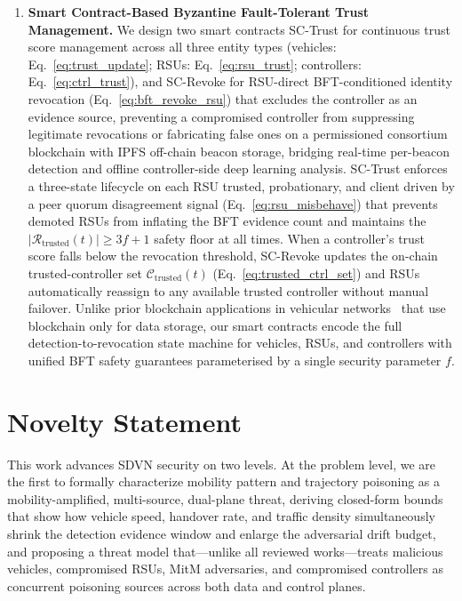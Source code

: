 \documentclass[12pt, a4paper]{report}
\begin{document}
\begin{enumerate}
\item \textbf{Smart Contract-Based Byzantine Fault-Tolerant Trust Management.}
We design two smart contracts
SC-Trust for continuous trust score management across all three
entity types (vehicles: Eq.~\eqref{eq:trust_update};
RSUs: Eq.~\eqref{eq:rsu_trust};
controllers: Eq.~\eqref{eq:ctrl_trust}),
and SC-Revoke for RSU-direct BFT-conditioned identity revocation
(Eq.~\eqref{eq:bft_revoke_rsu}) that excludes the controller
as an evidence source, preventing a compromised controller from
suppressing legitimate revocations or fabricating false ones
on a permissioned consortium blockchain with IPFS off-chain beacon
storage, bridging real-time per-beacon detection and offline
controller-side deep learning analysis.
SC-Trust enforces a three-state lifecycle on each RSU trusted,
probationary, and client driven by a peer quorum disagreement
signal (Eq.~\eqref{eq:rsu_misbehave}) that prevents demoted RSUs
from inflating the BFT evidence count and maintains the
$|\mathcal{R}_{\mathrm{trusted}}(t)| \geq 3f{+}1$ safety floor
at all times.
When a controller's trust score falls below the revocation threshold,
SC-Revoke updates the on-chain trusted-controller set
$\mathcal{C}_{\mathrm{trusted}}(t)$ (Eq.~\eqref{eq:trusted_ctrl_set})
and RSUs automatically reassign to any available trusted controller
without manual failover.
Unlike prior blockchain applications in vehicular
networks~\cite{sehar2023blockchain, yahiatene2018towards} that
use blockchain only for data storage, our smart contracts encode
the full detection-to-revocation state machine for vehicles, RSUs,
and controllers with unified BFT safety guarantees parameterised
by a single security parameter $f$.

\end{enumerate}

\section{Novelty Statement}
\label{sec:novelty}

This work advances SDVN security on two levels. At the problem level, we are the first to formally characterize mobility pattern and trajectory poisoning as a mobility-amplified, multi-source, dual-plane threat, deriving closed-form bounds that show how vehicle speed, handover rate, and traffic density simultaneously shrink the detection evidence window and enlarge the adversarial drift budget, and proposing a threat model that---unlike all reviewed works---treats malicious vehicles, compromised RSUs, MitM adversaries, and compromised controllers as concurrent poisoning sources across both data and control planes.
\end{document}
